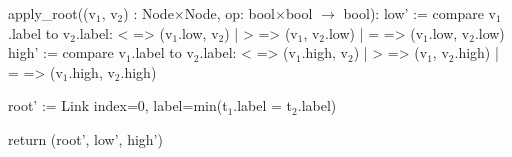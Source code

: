 \begin{blstlisting}
  apply_root((v$_1$, v$_2$) : Node$\times$Node, op: bool$\times$bool $\rightarrow$ bool):
    low' := compare v$_1$.label to v$_2$.label:  <  => (v$_1$.low, v$_2$)
                                      | > => (v$_1$, v$_2$.low)
                                      | = => (v$_1$.low, v$_2$.low)
    high' := compare v$_1$.label to v$_2$.label:  <  => (v$_1$.high, v$_2$)
                                       | > => (v$_1$, v$_2$.high)
                                       | = => (v$_1$.high, v$_2$.high)

    root' := Link{ index=0, label=min(t$_1$.label = t$_2$.label) }

    return (root', low', high')
\end{blstlisting}
